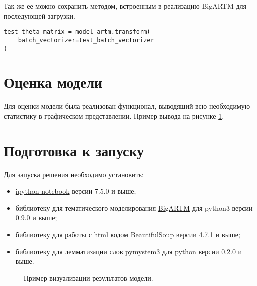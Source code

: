 Так же ее можно сохранить методом, встроенным в реализацию BigARTM для последующей загрузки.

\begin{lstlisting}
test_theta_matrix = model_artm.transform(
    batch_vectorizer=test_batch_vectorizer
)
\end{lstlisting}

\section{Оценка модели}

Для оценки модели была реализован функционал, выводящий всю необходимую статистику в графическом представлении. Пример вывода на рисунке \ref{fig:vis_example_0}.

%
\section{Подготовка к запуску}

Для запуска решения необходимо установить:

\begin{itemize}
    \item \href{https://ipython.readthedocs.io/en/stable/}{ipython notebook} версии 7.5.0 и выше;
    \item библиотеку для тематического моделирования \href{https://bigartm.readthedocs.io/en/stable/installation/index.html}{BigARTM} для python3 версии 0.9.0 и выше;
    \item библиотеку для работы с html кодом \href{https://www.crummy.com/software/BeautifulSoup/}{BeautifulSoup} версии 4.7.1 и выше;
    \item библиотеку для лемматизации слов \href{https://pypi.org/project/pymystem3/}{pymystem3} для python версии 0.2.0 и выше.
\end{itemize}

\begin{figure}[h]
    \caption{Пример визуализации результатов модели.}
    \label{fig:vis_example_0}
\end{figure}